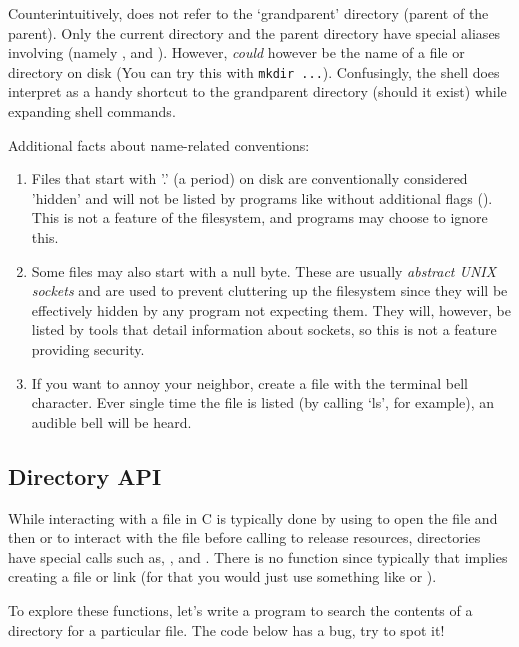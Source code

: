 Counterintuitively,  does not refer to the `grandparent' directory (parent of the parent).
Only the current directory and the parent directory have special aliases involving  (namely ,  and ).
However,  \emph{could} however be the name of a file or directory on disk (You can try this with \texttt{mkdir ...}).
Confusingly, the shell  does interpret  as a handy shortcut to the grandparent directory (should it exist) while expanding shell commands.

Additional facts about name-related conventions:

\begin{enumerate}
    \item Files that start with '.' (a period) on disk are conventionally considered 'hidden' and will not be listed by programs like  without additional flags ().
        This is not a feature of the filesystem, and programs may choose to ignore this.
    \item Some files may also start with a null byte.
            These are usually \emph{abstract UNIX sockets} and are used to prevent cluttering up the filesystem since they will be effectively hidden by any program not expecting them.
            They will, however, be listed by tools that detail information about sockets, so this is not a feature providing security.
    \item If you want to annoy your neighbor, create a file with the terminal bell character.
        Ever single time the file is listed (by calling `ls', for example), an audible bell will be heard.
\end{enumerate}

\subsection{Directory API}

While interacting with a file in C is typically done by using  to open the file and then  or  to interact with the file before calling  to release resources, directories have special calls such as, ,  and .
There is no function  since typically that implies creating a file or link (for that you would just use something like  or ).

To explore these functions, let's write a program to search the contents of a directory for a particular file.
The code below has a bug, try to spot it!


